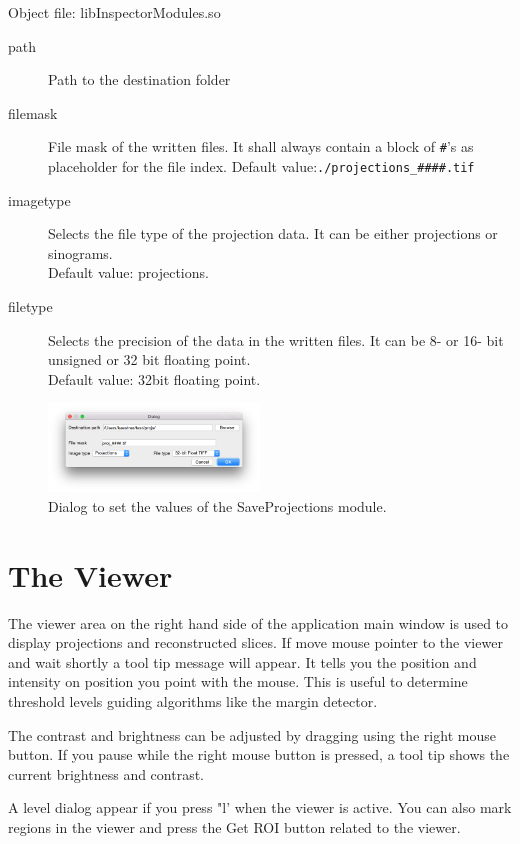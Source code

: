\documentclass[a4paper]{scrreprt}
\begin{document}
Object file: libInspectorModules.so
\begin{description}
\item[path] Path to the destination folder 
\item[filemask] File mask of the written files. It shall always contain a block of \verb+#+'s as placeholder for the file index. Default value:\verb+./projections_####.tif+
\item[imagetype] Selects the file type of the projection data. It can be either projections or sinograms. \\Default value: projections.
\item[filetype] Selects the precision of the data in the written files. It can be 8- or 16- bit unsigned or 32 bit floating point.\\Default value: 32bit floating point.
\end{description}
\begin{figure}[ht!]
\centering
\includegraphics[width=0.5\textwidth]{figures/SaveProjectionsDlg.png}
\caption{Dialog to set the values of the SaveProjections module.}
\end{figure}

\section{The Viewer}
The viewer area on the right hand side of the application main window is used to display projections and reconstructed slices. If move mouse pointer to the viewer and wait shortly a tool tip message will appear. It tells you the position and intensity on position you point with the mouse. This is useful to determine threshold levels guiding algorithms like the margin detector.

The contrast and brightness can be adjusted by dragging using the right mouse button. If you pause while the right mouse button is pressed, a tool tip shows the current brightness and contrast.

A level dialog appear if you press "l' when the viewer is active. You can also mark regions in the viewer and press the Get ROI button related to the viewer.  
\end{document}
